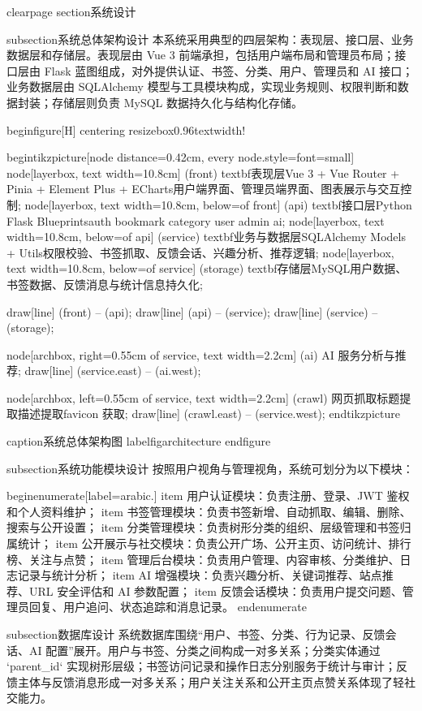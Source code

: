 clearpage
section{系统设计}

subsection{系统总体架构设计}
本系统采用典型的四层架构：表现层、接口层、业务数据层和存储层。表现层由 Vue 3 前端承担，包括用户端布局和管理员布局；接口层由 Flask 蓝图组成，对外提供认证、书签、分类、用户、管理员和 AI 接口；业务数据层由 SQLAlchemy 模型与工具模块构成，实现业务规则、权限判断和数据封装；存储层则负责 MySQL 数据持久化与结构化存储。

begin{figure}[H]
centering
resizebox{0.96textwidth}{!}{
begin{tikzpicture}[node distance=0.42cm, every node.style={font=small}]
  node[layerbox, text width=10.8cm] (front) {textbf{表现层}Vue 3 + Vue Router + Pinia + Element Plus + ECharts用户端界面、管理员端界面、图表展示与交互控制};
  node[layerbox, text width=10.8cm, below=of front] (api) {textbf{接口层}Python Flask Blueprintsauth  bookmark  category  user  admin  ai};
  node[layerbox, text width=10.8cm, below=of api] (service) {textbf{业务与数据层}SQLAlchemy Models + Utils权限校验、书签抓取、反馈会话、兴趣分析、推荐逻辑};
  node[layerbox, text width=10.8cm, below=of service] (storage) {textbf{存储层}MySQL用户数据、书签数据、反馈消息与统计信息持久化};

  draw[line] (front) -- (api);
  draw[line] (api) -- (service);
  draw[line] (service) -- (storage);

  node[archbox, right=0.55cm of service, text width=2.2cm] (ai) {AI 服务分析与推荐};
  draw[line] (service.east) -- (ai.west);

  node[archbox, left=0.55cm of service, text width=2.2cm] (crawl) {网页抓取标题提取描述提取favicon 获取};
  draw[line] (crawl.east) -- (service.west);
end{tikzpicture}
}
caption{系统总体架构图}
label{figarchitecture}
end{figure}

subsection{系统功能模块设计}
按照用户视角与管理视角，系统可划分为以下模块：

begin{enumerate}[label=arabic.]
    item 用户认证模块：负责注册、登录、JWT 鉴权和个人资料维护；
    item 书签管理模块：负责书签新增、自动抓取、编辑、删除、搜索与公开设置；
    item 分类管理模块：负责树形分类的组织、层级管理和书签归属统计；
    item 公开展示与社交模块：负责公开广场、公开主页、访问统计、排行榜、关注与点赞；
    item 管理后台模块：负责用户管理、内容审核、分类维护、日志记录与统计分析；
    item AI 增强模块：负责兴趣分析、关键词推荐、站点推荐、URL 安全评估和 AI 参数配置；
    item 反馈会话模块：负责用户提交问题、管理员回复、用户追问、状态追踪和消息记录。
end{enumerate}

subsection{数据库设计}
系统数据库围绕“用户、书签、分类、行为记录、反馈会话、AI 配置”展开。用户与书签、分类之间构成一对多关系；分类实体通过 `parent_id` 实现树形层级；书签访问记录和操作日志分别服务于统计与审计；反馈主体与反馈消息形成一对多关系；用户关注关系和公开主页点赞关系体现了轻社交能力。


